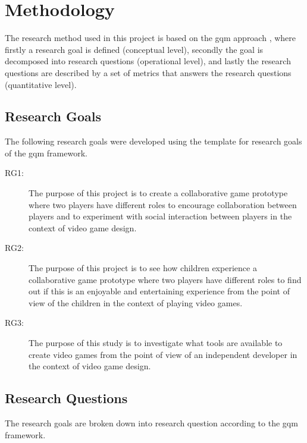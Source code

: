 \chapter{Methodology}
The research method used in this project is based on the \gls{gqm} approach \cite{1992basili}, where firstly a research goal is defined (conceptual level), secondly the goal is decomposed into research questions (operational level), and lastly the research questions are described by a set of metrics that answers the research questions (quantitative level).



\section{Research Goals}
The following research goals were developed using the template for research goals of the \gls{gqm} framework.
\begin{description}
	\item[RG1:] The purpose of this project is to create a collaborative game prototype where two players have different roles to encourage collaboration between players and to experiment with social interaction between players in the context of video game design.
	
	\item[RG2:] The purpose of this project is to see how children experience a collaborative game prototype where two players have different roles to find out if this is an enjoyable and entertaining experience from the point of view of the children in the context of playing video games.
	
	\item[RG3:] The purpose of this study is to investigate what tools are available to create video games from the point of view of an independent developer in the context of video game design. 
\end{description}




\section{Research Questions}
The research goals are broken down into research question according to the \gls{gqm} framework.
